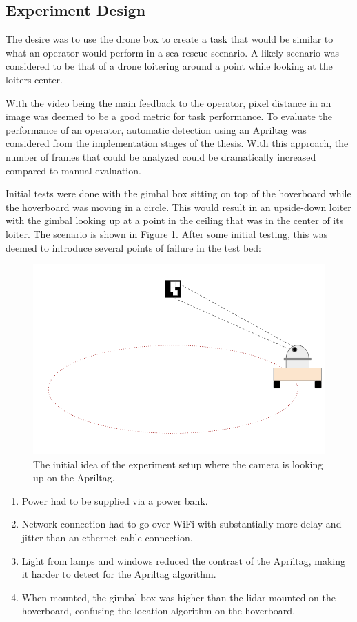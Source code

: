 \documentclass[nofilelist]{cslthse-msc}
\begin{document}
\subsection{Experiment Design}
The desire was to use the drone box to create a task that would be similar to what an operator would perform in a sea rescue scenario. A likely scenario was considered to be that of a drone loitering around a point while looking at the loiters center. 

With the video being the main feedback to the operator, pixel distance in an image was deemed to be a good metric for task performance. To evaluate the performance of an operator, automatic detection using an Apriltag was considered from the implementation stages of the thesis. With this approach, the number of frames that could be analyzed could be dramatically increased compared to manual evaluation.

Initial tests were done with the gimbal box sitting on top of the hoverboard while the hoverboard was moving in a circle. This would result in an upside-down loiter with the gimbal looking up at a point in the ceiling that was in the center of its loiter. The scenario is shown in Figure \ref{fig:testbed-idea-1}. After some initial testing, this was deemed to introduce several points of failure in the test bed:

\begin{figure}[htp]
   \centering
   \includegraphics[width=.6\textwidth]{images/testbed1.png}
   \caption{The initial idea of the experiment setup where the camera is looking up on the Apriltag. }
   \label{fig:testbed-idea-1}
\end{figure}

\begin{enumerate}
   \item Power had to be supplied via a power bank.
   \item Network connection had to go over WiFi with substantially more delay and jitter than an ethernet cable connection. 
   \item Light from lamps and windows reduced the contrast of the Apriltag, making it harder to detect for the Apriltag algorithm.
   \item When mounted, the gimbal box was higher than the lidar mounted on the hoverboard, confusing the location algorithm on the hoverboard.
\end{enumerate}
\end{document}
